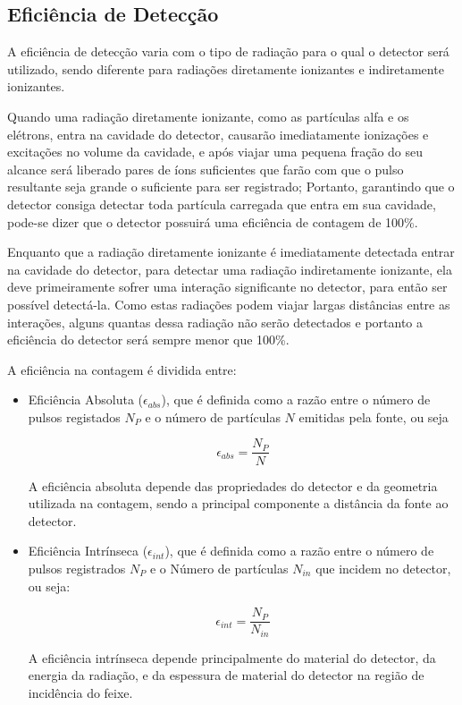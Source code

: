 \documentclass[11pt,a4paper]{article}
\begin{document}
	\subsection{Eficiência de Detecção}

		A eficiência de detecção varia com o tipo de radiação para o qual o detector será utilizado, sendo diferente para radiações diretamente ionizantes e indiretamente ionizantes.

		Quando uma radiação diretamente ionizante, como as partículas alfa e os elétrons, entra na cavidade do detector, causarão imediatamente ionizações e excitações no volume da cavidade, e após viajar uma pequena fração do seu alcance será liberado pares de íons suficientes que farão com que o pulso resultante seja grande o suficiente para ser registrado; Portanto, garantindo que o detector consiga detectar toda partícula carregada que entra em sua cavidade, pode-se dizer que o detector possuirá uma eficiência de contagem de 100\%. 

		Enquanto que a radiação diretamente ionizante é imediatamente detectada entrar na cavidade do detector, para detectar uma radiação indiretamente ionizante, ela deve primeiramente sofrer uma interação significante no detector, para então ser possível detectá-la. Como estas radiações podem viajar largas distâncias entre as interações, alguns quantas dessa radiação não serão detectados e portanto a eficiência do detector será sempre menor que 100\%.

		A eficiência na contagem é dividida entre:

			\begin{itemize}
				\item Eficiência Absoluta ($\epsilon_{abs}$), que é definida como a razão entre o número de pulsos registados $N_P$ e o número de partículas $N$ emitidas pela fonte, ou seja
				
					\begin{equation}
						\epsilon_{abs} = \frac{N_P}{N}
					\end{equation}
				
				A eficiência absoluta depende das propriedades do detector e da geometria  utilizada na contagem, sendo a principal componente a distância da fonte ao detector.
				
				\item Eficiência Intrínseca ($\epsilon_{int}$), que é definida como a razão entre o número de pulsos registrados $N_P$ e o Número de partículas $N_{in}$ que incidem no detector, ou seja:
				
					\begin{equation}
						\epsilon_{int} = \frac{N_P}{N_{in}}
					\end{equation}

				A eficiência intrínseca depende principalmente do material do detector, da energia da radiação, e da espessura de material do detector na região de incidência do feixe. 
			\end{itemize}
\end{document}
